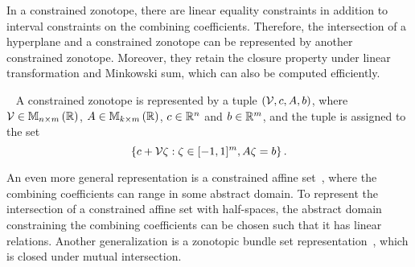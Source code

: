 In a constrained zonotope, there are linear equality constraints in
addition to interval constraints on the combining coefficients.
Therefore, the intersection of a hyperplane and a constrained zonotope
can be represented by another constrained zonotope.  Moreover, they
retain the closure property under linear transformation and Minkowski
sum, which can also be computed efficiently.
%
\begin{definition}~\cite{scott2016constrained}
A constrained zonotope is represented by a tuple
$\left(\mathcal{V},c,A,b\right)$, where $\mathcal{V}\in\mathbb{M}_{n\times m}\left(\mathbb{R}\right)$,
$A\in\mathbb{M}_{k\times m}\left(\mathbb{R}\right)$, $c\in\mathbb{R}^n$ and $b\in\mathbb{R}^m$, and
the tuple is assigned to the set
%
\[\left\{c+\mathcal{V}\zeta:\zeta\in[-1,1]^m,A\zeta=b\right\}.\]
%
\end{definition}
%
An even more general representation is a constrained affine
set~\cite{Ghorbal2010}, where the combining coefficients can range in some
abstract domain.  To represent the intersection of a constrained affine
set with half-spaces, the abstract domain constraining the combining
coefficients can be chosen such that it has linear relations.  Another
generalization is a zonotopic bundle set representation~\cite{althoff2011zonotope},
which is closed under mutual intersection.


